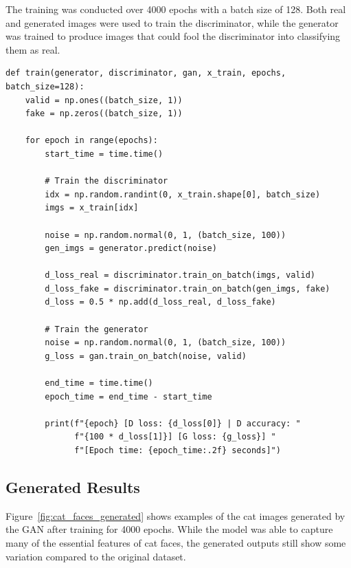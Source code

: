 The training was conducted over 4000 epochs with a batch size of 128. Both real and generated images were used to train the discriminator, while the generator was trained to produce images that could fool the discriminator into classifying them as real.

\begin{verbatim}
def train(generator, discriminator, gan, x_train, epochs, batch_size=128):
    valid = np.ones((batch_size, 1))
    fake = np.zeros((batch_size, 1))

    for epoch in range(epochs):
        start_time = time.time()

        # Train the discriminator
        idx = np.random.randint(0, x_train.shape[0], batch_size)
        imgs = x_train[idx]

        noise = np.random.normal(0, 1, (batch_size, 100))
        gen_imgs = generator.predict(noise)

        d_loss_real = discriminator.train_on_batch(imgs, valid)
        d_loss_fake = discriminator.train_on_batch(gen_imgs, fake)
        d_loss = 0.5 * np.add(d_loss_real, d_loss_fake)

        # Train the generator
        noise = np.random.normal(0, 1, (batch_size, 100))
        g_loss = gan.train_on_batch(noise, valid)

        end_time = time.time()
        epoch_time = end_time - start_time

        print(f"{epoch} [D loss: {d_loss[0]} | D accuracy: "
              f"{100 * d_loss[1]}] [G loss: {g_loss}] "
              f"[Epoch time: {epoch_time:.2f} seconds]")
\end{verbatim}

\subsection{Generated Results}

Figure~\ref{fig:cat_faces_generated} shows examples of the cat images generated by the GAN after training for 4000 epochs. While the model was able to capture many of the essential features of cat faces, the generated outputs still show some variation compared to the original dataset.

